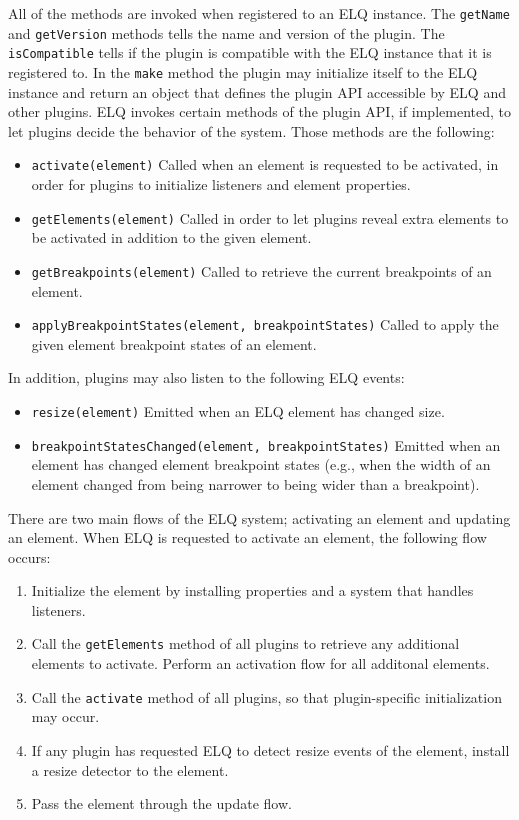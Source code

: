 \documentclass[]{llncs}
\newcommand{\code}[1]{\texttt{#1}}
\newcommand{\elq}{ELQ}
\begin{document}
  \noindent
  All of the methods are invoked when registered to an \elq{} instance.
  The \code{getName} and \code{getVersion} methods tells the name and version of the plugin.
  The \code{isCompatible} tells if the plugin is compatible with the \elq{} instance that it is registered to.
  In the \code{make} method the plugin may initialize itself to the \elq{} instance and return an object that defines the plugin API accessible by \elq{} and other plugins.
  \elq{} invokes certain methods of the plugin API, if implemented, to let plugins decide the behavior of the system.
  Those methods are the following:
  \begin{itemize}
    \item \code{activate(element)}
          Called when an element is requested to be activated, in order for plugins to initialize listeners and element properties.
    \item \code{getElements(element)}
          Called in order to let plugins reveal extra elements to be activated in addition to the given element.
    \item \code{getBreakpoints(element)}
          Called to retrieve the current breakpoints of an element.
    \item \code{applyBreakpointStates(element, breakpointStates)}
          Called to apply the given element breakpoint states of an element.
  \end{itemize}

  \noindent
  In addition, plugins may also listen to the following \elq{} events:
  \begin{itemize}
    \item \code{resize(element)}
          Emitted when an \elq{} element has changed size.
    \item \code{breakpointStatesChanged(element, breakpointStates)}
          Emitted when an element has changed element breakpoint states (e.g., when the width of an element changed from being narrower to being wider than a breakpoint).
  \end{itemize}

  \noindent
  There are two main flows of the \elq{} system; activating an element and updating an element.
  When \elq{} is requested to activate an element, the following flow occurs:

  \begin{enumerate}
    \item Initialize the element by installing properties and a system that handles listeners.
    \item
          Call the \code{getElements} method of all plugins to retrieve any additional elements to activate.
          Perform an activation flow for all additonal elements.
    \item Call the \code{activate} method of all plugins, so that plugin-specific initialization may occur.
    \item If any plugin has requested \elq{} to detect resize events of the element, install a resize detector to the element.
    \item Pass the element through the update flow.
  \end{enumerate}
\end{document}
